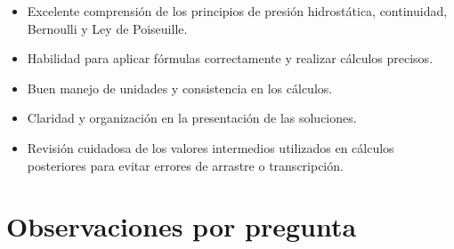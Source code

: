 \documentclass[11pt,a4paper]{article}
\begin{document}
\vspace{4pt}
\begin{minipage}[t]{0.48\linewidth}
  \begin{tcolorbox}[cajaFortaleza, title={Fortalezas}]
\begin{itemize}[leftmargin=1.5em, itemsep=2pt]
  \item Excelente comprensión de los principios de presión hidrostática, continuidad, Bernoulli y Ley de Poiseuille.
  \item Habilidad para aplicar fórmulas correctamente y realizar cálculos precisos.
  \item Buen manejo de unidades y consistencia en los cálculos.
  \item Claridad y organización en la presentación de las soluciones.
\end{itemize}
  \end{tcolorbox}
\end{minipage}
\hfill
\begin{minipage}[t]{0.48\linewidth}
  \begin{tcolorbox}[cajaMejora, title={Areas de mejora}]
\begin{itemize}[leftmargin=1.5em, itemsep=2pt]
  \item Revisión cuidadosa de los valores intermedios utilizados en cálculos posteriores para evitar errores de arrastre o transcripción.
\end{itemize}
  \end{tcolorbox}
\end{minipage}

\section*{Observaciones por pregunta}
\end{document}
